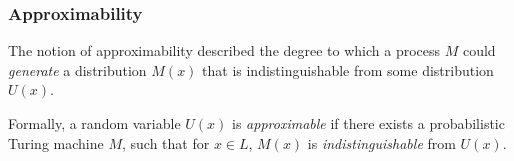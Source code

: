 %
%
%
%
%
%
%
%


%
%
%
%
%

\subsubsection{Approximability}

The notion of approximability described the degree to which a process $M$ could \textit{generate} a distribution $M(x)$ that is indistinguishable from some distribution $U(x)$.

Formally, a random variable $U(x)$ is \textit{approximable} if there exists a probabilistic Turing machine $M$, such that for $x \in L$, $M(x)$ is \textit{indistinguishable} from $U(x)$.

